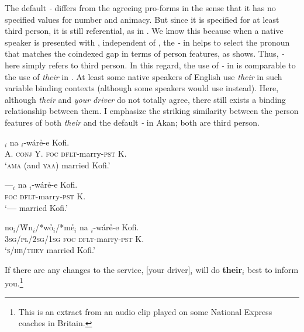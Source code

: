 \documentclass[output=paper]{LSP/langsci}
\begin{document}
 
The default \textit{\eer-} differs from the agreeing pro-forms in the sense that it has no specified values for number and animacy. But since it is specified for at least third person, it is still referential, as in . We know this because when a native speaker is presented with , independent of , the \textit{\eer-} in  helps to select the pronoun that matches the coindexed gap in terms of person features, as  shows. Thus, \textit{\eer-} here simply refers to third person.  In this regard, the use of \textit{\eer-} in  is comparable to the use of \textit{their} in . At least some native speakers of English use \textit{their} in such variable binding contexts (although some speakers would use  instead).  Here, although \textit{their} and \textit{your driver} do not totally agree, there still exists a binding relationship between them. I emphasize the striking similarity between the person features of both  \textit{their} and the default \textit{\eer-} in Akan; both are third person.


\ea\label{ex:korsah:24} 
\ea\label{ex:korsah:24a}
$_i$ na  \eer$_i$-w{\'{a}}r\h e-e Kofi.\\
 A. \textsc{conj} Y. \textsc{foc} \textsc{dflt}-marry-\textsc{pst} K.\\
\glt  `\textsc{ama} (and \textsc{yaa}) married Kofi.'

\ex\label{ex:korsah:24b}
\gll ---$_i$ na  \eer$_i$-w{\'{a}}r\h e-e Kofi.\\
{} \textsc{foc} \textsc{dflt}-marry-\textsc{pst} K. \\
\glt  `\textbf{---} married Kofi.'

\ex\label{ex:korsah:24c}
\gll \scalebox{1.5}{\oor}no$_i$/W\h\oor n$_i$/*w\h o$_i$/*m\h e$_i$ na  \eer$_i$-w{\'{a}}r\h e-e Kofi.\\
\textsc{3sg/pl/2sg/1sg} \textsc{foc} \textsc{dflt}-marry-\textsc{pst} K.\\
\glt  `\textsc{s/he/they} married Kofi.'

\z
\z



\ea\label{ex:korsah:25} 
\ea\label{ex:korsah:25a}  
If there are any changes to the service, [your driver]$_i$ will do \textbf{their}$_i$ best to inform you.\footnote{This is an extract from an audio clip played on some National Express coaches in Britain. }
\end{document}
